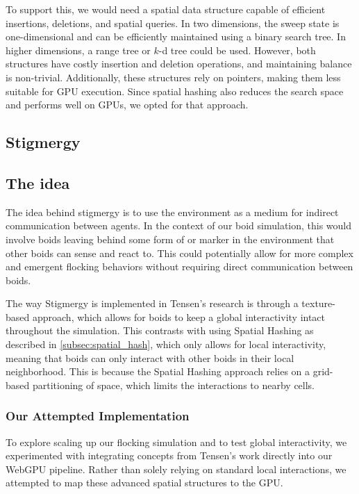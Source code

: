 \documentclass[a4paper, 12pt]{article}
\begin{document}
To support this, we would need a spatial data structure capable of efficient insertions, deletions,
and spatial queries. In two dimensions, the sweep state is one-dimensional and can be efficiently
maintained using a binary search tree. In higher dimensions, a range tree or $k$-d tree could be used.
However, both structures have costly insertion and deletion operations, and maintaining balance is
non-trivial. Additionally, these structures rely on pointers, making them less suitable for GPU
execution. Since spatial hashing also reduces the search space and performs well on GPUs, we opted
for that approach.

\subsection{Stigmergy}
\label{subsec:stigmergy}

\subsection*{The idea}
The idea behind stigmergy is to use the environment as a medium for indirect
communication between agents. In the context of our boid simulation, this would
involve boids leaving behind some form of  or marker in the
environment that other boids can sense and react to. This could potentially
allow for more complex and emergent flocking behaviors without requiring direct
communication between boids. \bigbreak

The way Stigmergy is implemented in Tensen's research \cite{order_of_magnitude_boids} is through a texture-based approach, which allows for boids to keep a global interactivity intact throughout the simulation. This contrasts with using Spatial Hashing as described in \ref{subsec:spatial_hash}, which only allows for local interactivity, meaning that boids can only interact with other boids in their local neighborhood. This is because the Spatial Hashing approach relies on a grid-based partitioning of space, which limits the interactions to nearby cells.

\subsubsection*{Our Attempted Implementation}
To explore scaling up our flocking simulation and to test global interactivity, we experimented with integrating concepts from Tensen's work directly into our WebGPU pipeline. Rather than solely relying on standard local interactions, we attempted to map these advanced spatial structures to the GPU.
\end{document}
